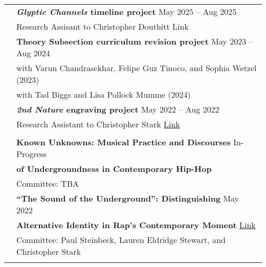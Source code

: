 \documentclass[letterpaper, 11pt]{article}
\begin{document}
\begin{longtable}{p{1.3in}p{4.8in}}
\nohyphens{\color{OliveGreen}{Research Projects}} 
& \textbf{\textit{Glyptic Channels} timeline project} \hfill May 2025 -- Aug 2025 \\
& Research Assisant to Christopher Douthitt \hfill Link \\
& \textbf{Theory Subsection curriculum revision project} \hfill May 2023 -- Aug 2024 \\
& with Varun Chandrasekhar, Felipe Guz Tinoco, and Sophia Wetzel \hfill (2023) \\
& with Tad Biggs and Lisa Pollock Mumme \hfill (2024) \\
& \textbf{\textit{2nd Nature} engraving project}  \hfill May 2022 -- Aug 2022\\
& Research Assistant to Christopher Stark \hfill \href{https://www.christopher-stark.com/scores/solo/2ndNature.pdf}{Link} \\
& \\

\nohyphens{\color{OliveGreen}{Writing Projects}} 
& \textbf{Known Unknowns: Musical Practice and Discourses} \hfill{In-Progress} \\
& \textbf{of Undergroundness in Contemporary Hip-Hop} \\
& Committee: TBA \\
& \textbf{``The Sound of the Underground'': Distinguishing} \hfill{May 2022} \\
& \textbf{Alternative Identity in Rap's Contemporary Moment} \hfill \href{https://doi.org/10.7936/cftv-at63}{Link} \\
& Committee: Paul Steinbeck, Lauren Eldridge Stewart, and Christopher Stark \\
& \\


\end{longtable}
\end{document}

